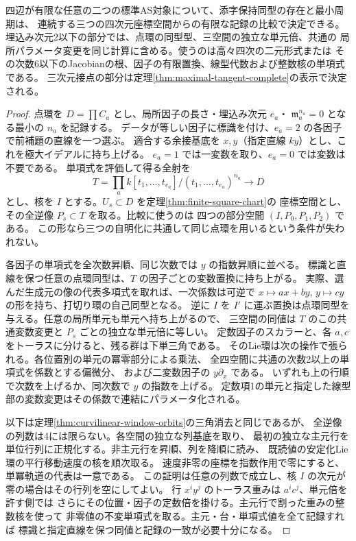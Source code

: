 \begin{theorem}\label{thm:finite-all-window-keys}
四辺が有限な任意の二つの標準AS対象について、添字保持同型の存在と最小周期は、
連続する三つの四次元座標空間からの有限な記録の比較で決定できる。
埋込み次元2以下の部分では、点環の同型型、三空間の独立な単元倍、共通の
局所パラメータ変更を同じ計算に含める。使うのは高々四次の二元形式または
その次数6以下のJacobianの根、因子の有限置換、線型代数および整数核の単項式である。
三次元接点の部分は定理\ref{thm:maximal-tangent-complete}の表示で決定される。
\end{theorem}
\begin{proof}
点環を $D=\prod C_a$ とし、局所因子の長さ・埋込み次元 $e_a$・
$\mathfrak m_a^{n_a}=0$ となる最小の $n_a$ を記録する。
データが等しい因子に標識を付け、$e_a=2$ の各因子で前補題の直線を一つ選ぶ。
適合する余接基底を $x,y$（指定直線 $ky$）とし、これを極大イデアルに持ち上げる。
$e_a=1$ では一変数を取り、$e_a=0$ では変数は不要である。
単項式を評価して得る全射を
\[
 T=\prod_a k[t_1,\ldots,t_{e_a}]/(t_1,\ldots,t_{e_a})^{n_a}
            \longrightarrow D
\]
とし、核を $I$ とする。$U_s\subset D$ を定理\ref{thm:finite-square-chart}の
座標空間とし、その全逆像 $P_s\subset T$ を取る。比較に使うのは
四つの部分空間 $(I,P_0,P_1,P_2)$ である。
この形なら三つの自明化に共通して同じ点環を用いるという条件が失われない。

各因子の単項式を全次数昇順、同じ次数では $y$ の指数昇順に並べる。
標識と直線を保つ任意の点環同型は、$T$ の因子ごとの変数置換に持ち上がる。
実際、選んだ生成元の像の代表多項式を取れば、一次係数は可逆で
$x\mapsto a x+b y$, $y\mapsto c y$ の形を持ち、打切り環の自己同型となる。
逆に $I$ を $I'$ に運ぶ置換は点環同型を与える。任意の局所単元も単元へ持ち上がるので、
三空間の同値は $T$ のこの共通変数変更と $P_s$ ごとの独立な単元倍に等しい。
定数因子のスカラーと、各 $a,c$ をトーラスに分けると、残る群は下単三角である。
そのLie環は次の操作で張られる。各位置別の単元の冪零部分による乗法、
全四空間に共通の次数2以上の単項式を係数とする偏微分、
および二変数因子の $y\partial_x$ である。
いずれも上の行順で次数を上げるか、同次数で $y$ の指数を上げる。
定数項1の単元と指定した線型部の変数変更はその係数で連結にパラメータ化される。

以下は定理\ref{thm:curvilinear-window-orbits}の三角消去と同じであるが、
全逆像の列数は4には限らない。各空間の独立な列基底を取り、
最初の独立な主元行を単位行列に正規化する。非主元行を昇順、列を降順に読み、
既読値の安定化Lie環の平行移動速度の核を順次取る。
速度非零の座標を指数作用で零にすると、単冪軌道の代表は一意である。
この証明は任意の列数で成立し、核 $I$ の次元が零の場合はその行列を空にしてよい。
行 $x^iy^j$ のトーラス重みは $a^ic^j$、単元倍を許す側では
さらにその位置・因子の定数倍を掛ける。主元行で割った重みの整数核を使って
非零値の不変単項式を取る。主元・台・単項式値を全て記録すれば
標識と指定直線を保つ同値と記録の一致が必要十分になる。


\end{proof}
